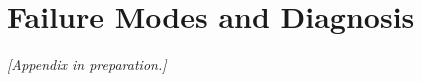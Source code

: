 \section{Failure Modes and Diagnosis}
\label{app:troubleshooting}

\emph{[Appendix in preparation.]}
